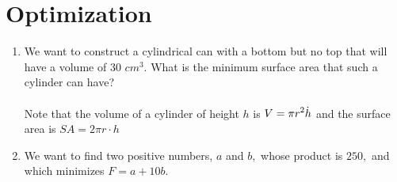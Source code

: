 \documentclass[10pt]{article}
\begin{document}
 \section{Optimization} 
 \begin{enumerate}
     \item We want to construct a cylindrical can with a bottom but no top that will have a volume of 30 $cm^3$. What is the minimum surface area that such a cylinder can have? \\\\Note that the volume of a cylinder of height $h$ is $\displaystyle V=\pi r^2\dot h$ and the surface area  is $SA=2\pi r\cdot h$
     \newpage
     \item We want to find two positive numbers, $a$ and $b,$ whose product is $250,$ and which minimizes $F=a + 10b.$
 \end{enumerate}
\end{document}
